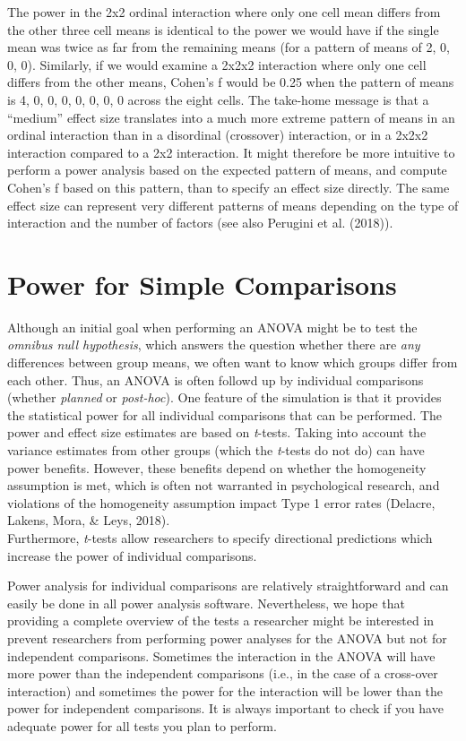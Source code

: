 \documentclass[,jou, draftfirst, a4paper,floatsintext]{apa6}
\begin{document}
The power in the 2x2 ordinal interaction where only one cell mean differs from the other three cell means is identical to the power we would have if the single mean was twice as far from the remaining means (for a pattern of means of 2, 0, 0, 0).
Similarly, if we would examine a 2x2x2 interaction where only one cell differs from the other means, Cohen's f would be 0.25 when the pattern of means is 4, 0, 0, 0, 0, 0, 0, 0 across the eight cells.
The take-home message is that a \enquote{medium} effect size translates into a much more extreme pattern of means in an ordinal interaction than in a disordinal (crossover) interaction, or in a 2x2x2 interaction compared to a 2x2 interaction.
It might therefore be more intuitive to perform a power analysis based on the expected pattern of means, and compute Cohen's f based on this pattern, than to specify an effect size directly.
The same effect size can represent very different patterns of means depending on the type of interaction and the number of factors (see also Perugini et al. (2018)).

\hypertarget{power-for-simple-comparisons}{%
\section{Power for Simple Comparisons}\label{power-for-simple-comparisons}}

Although an initial goal when performing an ANOVA might be to test the \emph{omnibus null hypothesis}, which answers the question whether there are \emph{any} differences between group means, we often want to know which groups differ from each other. Thus, an ANOVA is often followd up by individual comparisons (whether \emph{planned} or \emph{post-hoc}).
One feature of the simulation is that it provides the statistical power for all individual comparisons that can be performed.
The power and effect size estimates are based on \emph{t}-tests.
Taking into account the variance estimates from other groups (which the \emph{t}-tests do not do) can have power benefits.
However, these benefits depend on whether the homogeneity assumption is met, which is often not warranted in psychological research, and violations of the homogeneity assumption impact Type 1 error rates (Delacre, Lakens, Mora, \& Leys, 2018).\\
Furthermore, \emph{t}-tests allow researchers to specify directional predictions which increase the power of individual comparisons.

Power analysis for individual comparisons are relatively straightforward and can easily be done in all power analysis software.
Nevertheless, we hope that providing a complete overview of the tests a researcher might be interested in prevent researchers from performing power analyses for the ANOVA but not for independent comparisons.
Sometimes the interaction in the ANOVA will have more power than the independent comparisons (i.e., in the case of a cross-over interaction) and sometimes the power for the interaction will be lower than the power for independent comparisons.
It is always important to check if you have adequate power for all tests you plan to perform.
\end{document}
